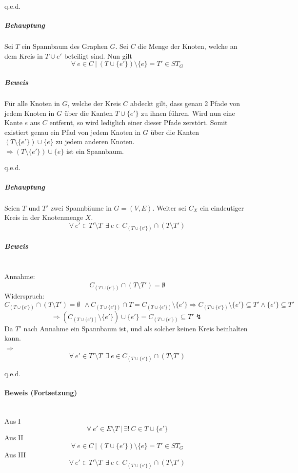 \documentclass[a4paper,11pt,twoside]{scrartcl}
\newcounter{beweis}
\begin{document}
\begin{flushright}
	q.e.d.
\end{flushright}
\subparagraph{ Behauptung}
Sei $T$ ein Spannbaum des Graphen $G$. Sei $C$ die Menge der Knoten, welche an dem Kreis in $T\cup e'$ beteiligt sind. Nun gilt 
\[ \forall~e\in C ~|~ (T\cup \{e'\})\setminus \{e\} =T'\in ST_G \]
\subparagraph{ Beweis}
Für alle Knoten in $G$, welche der Kreis $C$ abdeckt gilt, dass genau 2 Pfade von jedem Knoten in $G$ über die Kanten $T\cup \{e'\}$ zu ihnen führen. Wird nun eine Kante $e$ aus $C$ entfernt, so wird lediglich einer dieser Pfade zerstört. Somit existiert genau ein Pfad von jedem Knoten in $G$ über die Kanten $(T\setminus \{e'\})\cup \{e\}$ zu jedem anderen Knoten.\\
$\Rightarrow (T\setminus \{e'\})\cup \{e\}$ ist ein Spannbaum.

\begin{flushright}
	q.e.d.
\end{flushright}
\subparagraph{ Behauptung}
Seien $T$ und $T'$ zwei Spannbäume in $G=(V,E)$. Weiter sei $C_X$ ein eindeutiger Kreis in der Knotenmenge $X$. 
\[ \forall~e'\in T'\setminus T~~\exists~e\in C_{(T\cup \{e'\})}\cap (T\setminus T')\]
\subparagraph{ Beweis}$ $\\
Annahme: \[C_{(T\cup \{e'\})}\cap (T\setminus T') = \emptyset\]
Widerspruch:
\[ C_{(T\cup \{e'\})}\cap (T\setminus T') = \emptyset~~\land C_{(T\cup \{e'\})} \cap T = C_{(T\cup \{e'\})}\setminus\{ e' \} \Rightarrow C_{(T\cup \{e'\})}\setminus\{ e' \}\subseteq T' \land \{ e' \} \subseteq T'\]
\[ \Rightarrow(C_{(T\cup \{e'\})}\setminus\{ e' \})\cup \{e'\} = C_{(T\cup \{e'\})} \subseteq T' \lightning \]
Da $T'$ nach Annahme ein Spannbaum ist, und als solcher keinen Kreis beinhalten kann.\\
$\Rightarrow $
\[ \forall~e'\in T'\setminus T~~\exists~e\in C_{(T\cup \{e'\})}\cap (T\setminus T') \]

\begin{flushright}
	q.e.d.
\end{flushright}
\paragraph{Beweis (Fortsetzung)}$ $\\
Aus I
\[ \forall~ e'\in E\setminus T ~|~ \exists!~ C\in T\cup \{e'\} \]
Aus II
\[ \forall~e\in C ~|~ (T\cup \{e'\})\setminus \{e\} =T'\in ST_G \]
Aus III
\[ \forall~e'\in T'\setminus T~~\exists~e\in C_{(T\cup \{e'\})}\cap (T\setminus T')\]
\end{document}
